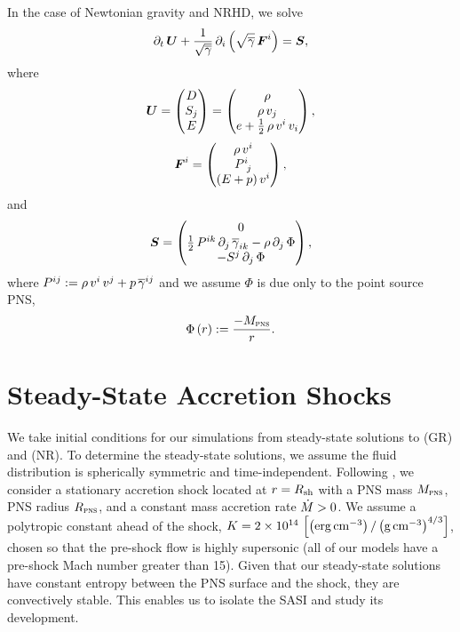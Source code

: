 In the case of Newtonian gravity and NRHD, we solve\begin{equation}
  \partial_{t}\,\boldsymbol{U}
  +\frac{1}{\sqrt{\overline{\gamma}}}\,
  \partial_{i}\left(\sqrt{\overline{\gamma}}\,\boldsymbol{F}^{i}\right)=\boldsymbol{S},
  \label{eq.AP.cLawsNR}
\end{equation}
where
\begin{equation}
  \boldsymbol{U}
  =\begin{pmatrix}
  D\\
  S_{j}\\
  E
  \end{pmatrix}
  =\begin{pmatrix}
  \rho\\
  \rho\,v_{j}\\
  e+\frac{1}{2}\,\rho\,v^{i}\,v_{i}
  \end{pmatrix},
\end{equation}
\begin{equation}
  \boldsymbol{F}^{i}
  =\begin{pmatrix}
  \rho\,v^{i}\\
  P^{i}_{~j}\\
  \left(E+p\right)v^{i}
  \end{pmatrix},
\end{equation}
and
\begin{equation}
  \boldsymbol{S}
  =\begin{pmatrix}
  0\\
  \frac{1}{2}\,P^{ik}\,\partial_{j}\,\overline{\gamma}_{ik}
  -\rho\,\partial_{j}\,\Phi\\
  -S^{j}\,\partial_{j}\,\Phi
  \end{pmatrix},
\end{equation}
where
$P^{ij}:=\rho\,v^{i}\,v^{j}+p\,\overline{\gamma}^{ij}$ and we assume $\Phi$
is due only to the point source PNS,
\begin{equation}
  \Phi\left(r\right):=\frac{-M_{\textsc{pns}}}{r}.
\end{equation}

\section{Steady-State Accretion Shocks}
\label{ss.ssas}

We take initial conditions for our simulations from steady-state
solutions to  (GR) and  (NR).
To determine the steady-state solutions,
we assume the fluid distribution is spherically symmetric and time-independent.
Following \citet{bmd2003},
we consider a stationary accretion shock located at $r=R_{\mathrm{sh}}$
with a PNS mass $M_{\textsc{pns}}$, PNS radius $R_{\textsc{pns}}$,
and a constant mass accretion rate
$\dot{M}>0$.
We assume a polytropic constant ahead of the shock, $K=2\times10^{14}\,
\left[\left(\mathrm{erg}\,\mathrm{cm}^{-3}\right)/\left(\mathrm{g}\,\mathrm{cm}^{-3}\right)^{4/3}\right]$,
chosen so that the pre-shock flow is highly supersonic
(all of our models have a pre-shock Mach number greater than 15).
Given that our steady-state solutions have constant
entropy between the PNS surface and the shock, they are convectively stable.
This enables us to isolate the SASI and study its development.

